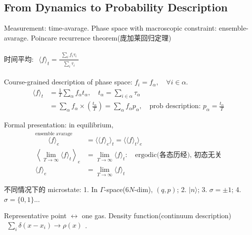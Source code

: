 \documentclass[../../main.tex]{subfiles}
\begin{document}
\subsection{From Dynamics to Probability Description}

Measurement: time-avarage. Phase space with macroscopic constraint: ensemble-avarage. Poincare recurrence theorem(庞加莱回归定理)

时间平均: $\begin{aligned}
    \langle f\rangle_{t} = \frac{\begin{aligned}
        \sum_{i}f_{i}\tau_{i}
    \end{aligned}}{\begin{aligned}
        \sum_{i}\tau_{i}
    \end{aligned}}
\end{aligned}$

Course-grained description of phase space: $f_{i} = f_{\alpha},\quad\forall i\in\alpha$.
\begin{align*}
    \langle f\rangle_{t} &= \frac{1}{T}\sum_{\alpha}f_{\alpha}t_{\alpha},\quad t_{\alpha} = \sum_{i\in\alpha}\tau_{\alpha}\\
    &= \sum_{\alpha}f_{\alpha}\times \left(\frac{t_{\alpha}}{T}\right) = \sum_{\alpha}f_{\alpha}p_{\alpha},\quad\text{prob description: } p_{\alpha} = \frac{t_{\alpha}}{T}
\end{align*}

Formal presentation: in equilibrium, 
\begin{align*}
    \stackrel{\text{ensemble avarage}}{\langle f\rangle_{e}} &= \langle\langle f\rangle_{e}\rangle_{t} = \langle\langle f\rangle_{t}\rangle_{e}\\
    \left\langle\lim_{T\rightarrow\infty}\langle f\rangle_{t}\right\rangle _{e} &= \lim_{T\rightarrow\infty}\langle f\rangle_{t}: \quad\text{ergodic(各态历经), 初态无关}\\
    \langle f\rangle_{e} &= \lim_{T\rightarrow\infty}\langle f\rangle_{t}
\end{align*}

不同情况下的 microstate: 1. In $\Gamma$-space($6N$-dim), $(q,p)$; 2. $|n\rangle$; 3. $\sigma = \pm 1$; 4. $\sigma = \{0,1\}$...

Representative point $\leftrightarrow$ one gas. Density function(continuum description) $\begin{aligned}
    \sum_{i}\delta(x-x_{i})\rightarrow \rho(x)
\end{aligned}$. 
\end{document}
